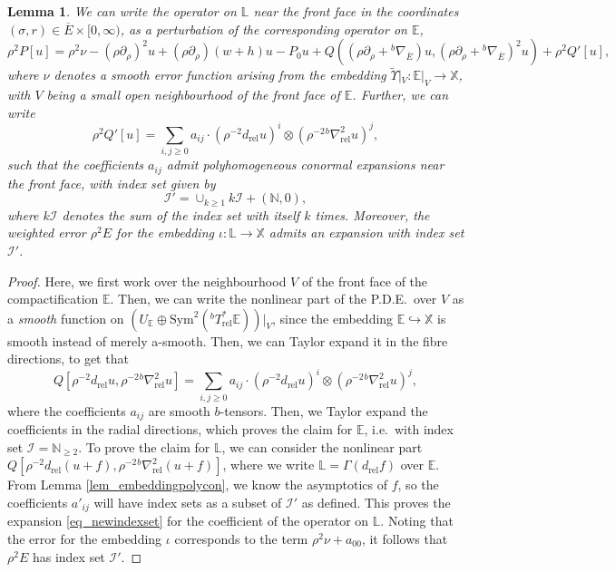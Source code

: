 \documentclass[10pt, a4paper]{article}
\theoremstyle{plain}%
\newtheorem{lem}[theorem]{Lemma}
\theoremstyle{definition}
\numberwithin{figure}{section}
\numberwithin{equation}{section}
\newcommand{\bL}{\mathbb{L}}
\newcommand{\bX}{\mathbb{X}}
\newcommand{\bE}{\mathbb{E}}
\newcommand{\bN}{\mathbb{N}}
\newcommand{\pa}{\partial}
\newcommand{\rt}{\rightarrow}
\newcommand{\tU}{\widetilde{\Upsilon}}
\newcommand{\rel}{\mathrm{rel}}
\newcommand{\oE}{{\overline{E}}}
\newcommand{\cI}{\mathcal{I}}
\begin{document}
\begin{lem}
	We can write the operator on $\bL$ near the front face in the coordinates $(\sigma,r)\in \oE\times[0,\infty)$, as a perturbation of the corresponding operator on $\bE$,
	\begin{equation}\label{eq_nonlinearpde}
		\rho^2P[u]= \rho^2\nu - (\rho\pa_\rho)^2u+(\rho\pa_\rho)(w+h)u - P_0u + Q((\rho\pa_\rho+{^b\nabla}_{\oE})u,(\rho\pa_\rho+{^b\nabla}_{\oE})^2u)+\rho^2Q'[u],
	\end{equation}
	where $\nu$ denotes a smooth error function arising from the embedding $\tU|_{V}: \bE|_{V} \rt \bX$, with $V$ being a small open neighbourhood of the front face of $\bE$. Further, we can write 
	\begin{equation}\label{eq_newindexset}
	\rho^2Q'[u] = \sum_{i,j \geq 0} a_{ij}\cdot(\rho^{-2}d_\rel u)^i\otimes(\rho^{-2}{^b\nabla^2_\rel}u)^j,
	\end{equation}
	such that the coefficients $a_{ij}$ admit polyhomogeneous conormal expansions near the front face, with index set given by 
	\begin{equation}\label{eq_solutionindexset}
		\cI'= \cup_{k\geq 1} k\cI+(\bN,0),
	\end{equation}
	where $k\cI$ denotes the sum of the index set with itself $k$ times. Moreover, the weighted error $\rho^2E$ for the embedding $\iota:\bL \rt \bX$ admits an expansion with index set $\cI'$.
\end{lem}
\begin{proof}
	Here, we first work over the neighbourhood $V$ of the front face of the compactification $\bE$. Then, we can write the nonlinear part of the P.D.E.\ over $V$ as a \textit{smooth} function on $(U_\bE\oplus \textrm{Sym}^2(^bT^*_\rel\bE))|_{V}$, since the embedding $\bE\hookrightarrow\bX$ is smooth instead of merely a-smooth. Then, we can Taylor expand it in the fibre directions, to get that\[
	Q[\rho^{-2}d_\rel u, \rho^{-2}{^b\nabla^2_\rel}u] = \sum_{i,j \geq 0} a_{ij}\cdot(\rho^{-2}d_\rel u)^i\otimes(\rho^{-2}{^b\nabla^2_\rel}u)^j,
	\]
	where the coefficients $a_{ij}$ are smooth $b$-tensors. Then, we Taylor expand the coefficients in the radial directions, which proves the claim for $\bE$, i.e.\ with index set $\cI = \bN_{\geq 2}$. To prove the claim for $\bL$, we can consider the nonlinear part $Q[\rho^{-2}d_\rel (u+f),\rho^{-2}{^b\nabla^2_\rel (u+f)}]$, where we write $\bL = \Gamma(d_\rel f)$ over $\bE$. From Lemma \ref{lem_embeddingpolycon}, we know the asymptotics of $f$, so the coefficients $a'_{ij}$ will have index sets as a subset of $\cI'$ as defined. This proves the expansion \eqref{eq_newindexset} for the coefficient of the operator on $\bL$. Noting that the error for the embedding $\iota$ corresponds to the term $\rho^2\nu + a_{00}$, it follows that $\rho^2E$ has index set $\cI'$. 
\end{proof}
\end{document}
